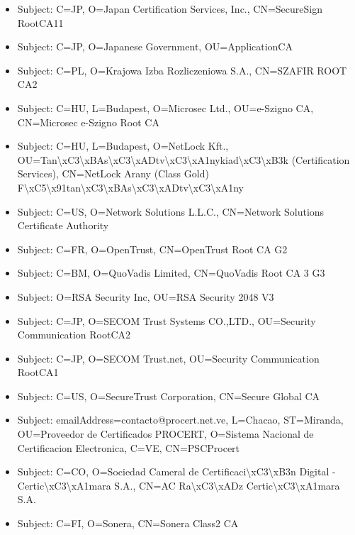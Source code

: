 \documentclass[xcolor={dvipsnames,svgnames},hyperref=dvips]{beamer}
\begin{document}
	\begin{frame}
		\begin{itemize}
		\item Subject: C=JP, O=Japan Certification Services, Inc., CN=SecureSign RootCA11
		\item Subject: C=JP, O=Japanese Government, OU=ApplicationCA
		\item Subject: C=PL, O=Krajowa Izba Rozliczeniowa S.A., CN=SZAFIR ROOT CA2
		\item Subject: C=HU, L=Budapest, O=Microsec Ltd., OU=e-Szigno CA, CN=Microsec e-Szigno Root CA
		\item Subject: C=HU, L=Budapest, O=NetLock Kft., OU=Tan\textbackslash xC3\textbackslash xBAs\textbackslash xC3\textbackslash xADtv\textbackslash xC3\textbackslash xA1nykiad\textbackslash xC3\textbackslash xB3k (Certification Services), CN=NetLock Arany (Class Gold) F\textbackslash xC5\textbackslash x91tan\textbackslash xC3\textbackslash xBAs\textbackslash xC3\textbackslash xADtv\textbackslash xC3\textbackslash xA1ny
		\end{itemize}
	\end{frame}
	\begin{frame}
		\begin{itemize}
		\item Subject: C=US, O=Network Solutions L.L.C., CN=Network Solutions Certificate Authority
		\item Subject: C=FR, O=OpenTrust, CN=OpenTrust Root CA G2
		\item Subject: C=BM, O=QuoVadis Limited, CN=QuoVadis Root CA 3 G3
		\item Subject: O=RSA Security Inc, OU=RSA Security 2048 V3
		\item Subject: C=JP, O=SECOM Trust Systems CO.,LTD., OU=Security Communication RootCA2
		\end{itemize}
	\end{frame}
	\begin{frame}
		\begin{itemize}
		\item Subject: C=JP, O=SECOM Trust.net, OU=Security Communication RootCA1
		\item Subject: C=US, O=SecureTrust Corporation, CN=Secure Global CA
		\item Subject: emailAddress=contacto@procert.net.ve, L=Chacao, ST=Miranda, OU=Proveedor de Certificados PROCERT, O=Sistema Nacional de Certificacion Electronica, C=VE, CN=PSCProcert
		\item Subject: C=CO, O=Sociedad Cameral de Certificaci\textbackslash xC3\textbackslash xB3n Digital - Certic\textbackslash xC3\textbackslash xA1mara S.A., CN=AC Ra\textbackslash xC3\textbackslash xADz Certic\textbackslash xC3\textbackslash xA1mara S.A.
		\item Subject: C=FI, O=Sonera, CN=Sonera Class2 CA
		\end{itemize}
	\end{frame}
\end{document}
